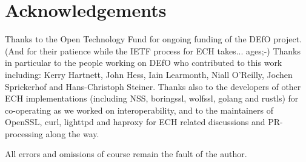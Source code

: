 \section*{Acknowledgements}

Thanks to the Open Technology Fund for ongoing funding of the DEfO
project. (And for their patience while the IETF process for ECH takes...
ages;-)
Thanks in particular to the people working on DEfO who contributed to this work
including:
Kerry Hartnett,
John Hess,
Iain Learmonth,
Niall O'Reilly,
Jochen Sprickerhof
and Hans-Christoph Steiner.
Thanks also to the developers of other ECH implementations (including
NSS, boringssl, wolfssl, golang and rustls) for co-operating as we worked on
interoperability, and to the maintainers of OpenSSL, curl, lighttpd
and haproxy for ECH related discussions and PR-processing along the way.

All errors and omissions of course remain the fault of the author.
